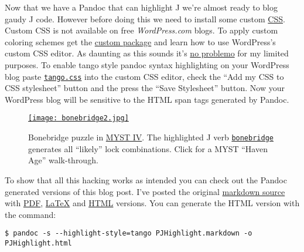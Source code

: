 Now that we have a Pandoc that can highlight J we're almost ready to
blog gaudy J code. However before doing this we need to install some
\captionsetup[floatingfigure]{labelformat=empty}
custom \href{http://www.htmldog.com/guides/cssbeginner/}{CSS}. Custom
CSS is not available on free \emph{WordPress.com} blogs. To apply custom
coloring schemes get the
\href{http://en.support.wordpress.com/custom-design/}{custom package}
and learn how to use WordPress's custom CSS editor. As daunting as this
sounds it's \href{http://www.youtube.com/watch?v=4QWfrxYt9DQ}{no
problemo} for my limited purposes. To enable tango style pandoc syntax
highlighting on your WordPress blog paste 
\href{https://github.com/bakerjd99/jacks/blob/master/jodliterate/tango.css}{\texttt{tango.css}}
into the custom CSS editor, check the ``Add my CSS to CSS stylesheet'' button and
the press the ``Save Stylesheet'' button. Now your WordPress blog will
be sensitive to the HTML span tags generated by Pandoc.

\captionsetup[figure]{labelformat=empty}
\begin{SCfigure}
\centering
\href{http://www.youtube.com/watch?v=GW8zcbr9Zko}{\texttt{[image: bonebridge2.jpg]}}
\caption{Bonebridge puzzle in
\href{http://en.wikipedia.org/wiki/Myst\_IV:\_Revelation}{MYST IV}.
The highlighted J verb \href{https://github.com/bakerjd99/jacks/blob/master/jodliterate/bonebridge.ijs}{\texttt{bonebridge}} generates all ``likely'' lock combinations.
Click for a MYST ``Haven Age'' walk-through.}
\label{fig:3202X0}
\end{SCfigure}

To show that all this hacking works as intended you can check out the
Pandoc generated versions of this blog post. I've posted the original
\href{https://github.com/bakerjd99/jacks/blob/master/jodliterate/PJHighlight.markdown}{markdown source} with
\href{https://github.com/bakerjd99/jacks/blob/master/jodliterate/PJHighlight.pdf}{PDF},
\href{https://github.com/bakerjd99/jacks/blob/master/jodliterate/PJHighlight.tex}{\LaTeX} and
\href{https://github.com/bakerjd99/jacks/blob/master/jodliterate/PJHighlight.html}{HTML} versions. You can generate the
HTML version with the command:

\footnotesize
\begin{tcolorbox}[breakable, size=fbox, boxrule=1pt, pad at break*=1mm,colback=cellbackground, colframe=cellborder]
\begin{verbatim}
$ pandoc -s --highlight-style=tango PJHighlight.markdown -o PJHighlight.html
\end{verbatim}
\end{tcolorbox}
\normalsize

